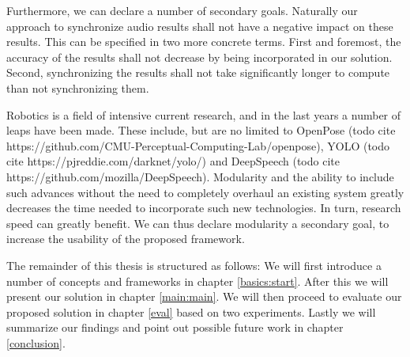 Furthermore, we can declare a number of secondary goals.
Naturally our approach to synchronize audio results shall not have a negative impact on these results.
This can be specified in two more concrete terms.
First and foremost, the accuracy of the results shall not decrease by being incorporated in our solution.
Second, synchronizing the results shall not take significantly longer to compute than not synchronizing them.


Robotics is a field of intensive current research, and in the last years a number of leaps have been made.
These include, but are no limited to OpenPose (todo cite https://github.com/CMU-Perceptual-Computing-Lab/openpose), YOLO (todo cite https://pjreddie.com/darknet/yolo/) and DeepSpeech (todo cite https://github.com/mozilla/DeepSpeech).
Modularity and the ability to include such advances without the need to completely overhaul an existing system greatly decreases the time needed to incorporate such new technologies.
In turn, research speed can greatly benefit.
We can thus declare modularity a secondary goal, to increase the usability of the proposed framework.


The remainder of this thesis is structured as follows:
We will first introduce a number of concepts and frameworks in chapter \ref{basics:start}.
After this we will present our solution in chapter \ref{main:main}.
We will then proceed to evaluate our proposed solution in chapter \ref{eval} based on two experiments.
Lastly we will summarize our findings and point out possible future work in chapter \ref{conclusion}.


